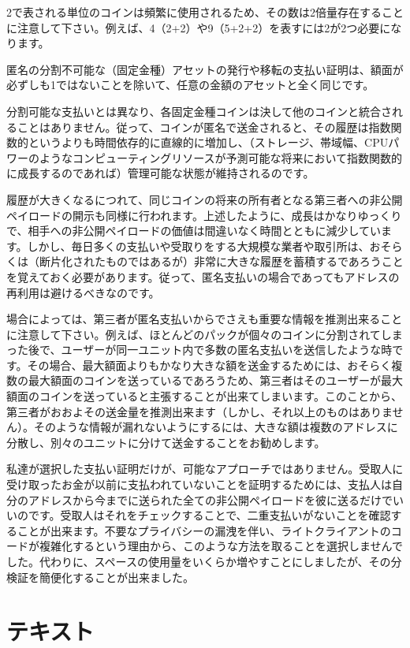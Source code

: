 \documentclass[a4paper, dvipdfmx]{jsarticle}
\begin{document}
\noindent 2で表される単位のコインは頻繁に使用されるため、その数は2倍量存在することに注意して下さい。例えば、4（2+2）や9（5+2+2）を表すには2が2つ必要になります。

匿名の分割不可能な（固定金種）アセットの発行や移転の支払い証明は、額面が必ずしも1ではないことを除いて、任意の金額のアセットと全く同じです。

分割可能な支払いとは異なり、各固定金種コインは決して他のコインと統合されることはありません。従って、コインが匿名で送金されると、その履歴は指数関数的というよりも時間依存的に直線的に増加し、（ストレージ、帯域幅、CPUパワーのようなコンピューティングリソースが予測可能な将来において指数関数的に成長するのであれば）管理可能な状態が維持されるのです。

履歴が大きくなるにつれて、同じコインの将来の所有者となる第三者への非公開ペイロードの開示も同様に行われます。上述したように、成長はかなりゆっくりで、相手への非公開ペイロードの価値は間違いなく時間とともに減少しています。しかし、毎日多くの支払いや受取りをする大規模な業者や取引所は、おそらくは（断片化されたものではあるが）非常に大きな履歴を蓄積するであろうことを覚えておく必要があります。従って、匿名支払いの場合であってもアドレスの再利用は避けるべきなのです。

場合によっては、第三者が匿名支払いからでさえも重要な情報を推測出来ることに注意して下さい。例えば、ほとんどのパックが個々のコインに分割されてしまった後で、ユーザーが同一ユニット内で多数の匿名支払いを送信したような時です。その場合、最大額面よりもかなり大きな額を送金するためには、おそらく複数の最大額面のコインを送っているであろうため、第三者はそのユーザーが最大額面のコインを送っていると主張することが出来てしまいます。このことから、第三者がおおよその送金量を推測出来ます（しかし、それ以上のものはありません）。そのような情報が漏れないようにするには、大きな額は複数のアドレスに分散し、別々のユニットに分けて送金することをお勧めします。

私達が選択した支払い証明だけが、可能なアプローチではありません。受取人に受け取ったお金が以前に支払われていないことを証明するためには、支払人は自分のアドレスから今までに送られた全ての非公開ペイロードを彼に送るだけでいいのです。受取人はそれをチェックすることで、二重支払いがないことを確認することが出来ます。不要なプライバシーの漏洩を伴い、ライトクライアントのコードが複雑化するという理由から、このような方法を取ることを選択しませんでした。代わりに、スペースの使用量をいくらか増やすことにしましたが、その分検証を簡便化することが出来ました。


\section{テキスト}
\end{document}
